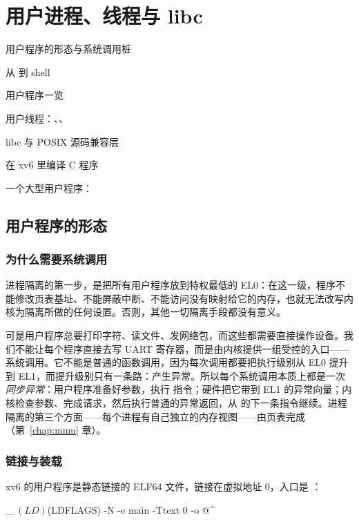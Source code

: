 \chapter{用户进程、线程与 libc}
\label{chap:user}

\begin{introduction}[本章内容]
  \item 用户程序的形态与系统调用桩
  \item 从  到 shell
  \item 用户程序一览
  \item 用户线程：、、
  \item libc 与 POSIX 源码兼容层
  \item 在 xv6 里编译 C 程序
  \item 一个大型用户程序：
\end{introduction}

\section{用户程序的形态}

\subsection{为什么需要系统调用}

进程隔离的第一步，是把所有用户程序放到特权最低的 EL0：在这一级，程序不能修改页表基址、不能屏蔽中断、不能访问没有映射给它的内存，也就无法改写内核为隔离所做的任何设置。否则，其他一切隔离手段都没有意义。

可是用户程序总要打印字符、读文件、发网络包，而这些都需要直接操作设备。我们不能让每个程序直接去写 UART 寄存器，而是由内核提供一组受控的入口——系统调用。它不能是普通的函数调用，因为每次调用都要把执行级别从 EL0 提升到 EL1，而提升级别只有一条路：产生异常。所以每个系统调用本质上都是一次\emph{同步异常}：用户程序准备好参数，执行  指令；硬件把它带到 EL1 的异常向量；内核检查参数、完成请求，然后执行普通的异常返回，从  的下一条指令继续。进程隔离的第三个方面——每个进程有自己独立的内存视图——由页表完成（第~\ref{chap:mmu} 章）。


\subsection{链接与装载}

xv6 的用户程序是静态链接的 ELF64 文件，链接在虚拟地址 0，入口是 ：

\begin{makecode}
_%
	$(LD) $(LDFLAGS) -N -e main -Ttext 0 -o $@ $^
\end{makecode}

